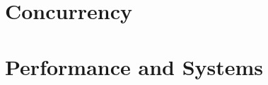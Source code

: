 









































\part{Concurrency}



























\part{Performance and Systems}

